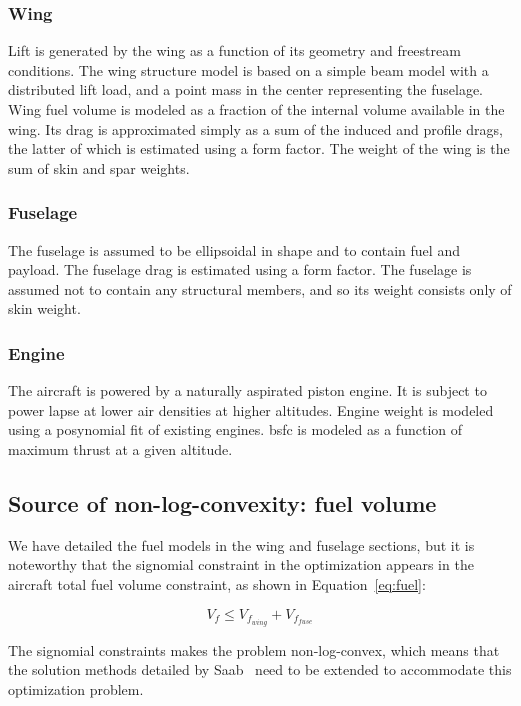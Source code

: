 \subsubsection{Wing}

Lift is generated by the wing as a function of its geometry and freestream conditions.
The wing structure model is based on a simple beam model with a distributed lift load,
and a point mass in the center representing the fuselage.
Wing fuel volume is modeled as a fraction of the internal volume available in the wing.
Its drag is
approximated simply as a sum of the induced and profile drags, the latter of which is estimated using a
form factor. The weight of the wing is the sum of skin and spar weights.

\subsubsection{Fuselage}

The fuselage is assumed to be ellipsoidal in shape and to contain fuel and payload.
The fuselage drag is estimated using a form factor.
The fuselage is assumed not to contain any structural members, and so its weight consists only of skin weight.

\subsubsection{Engine}

The aircraft is powered by a naturally aspirated piston engine. It is subject to
power lapse at lower air densities at higher altitudes. Engine weight is modeled using a posynomial fit of existing
engines. \gls{bsfc} is modeled as a function of maximum thrust at a given altitude.

\subsection{Source of non-log-convexity: fuel volume}
We have detailed the fuel models in the wing and fuselage sections, but it is noteworthy that
the signomial constraint in the optimization appears in the aircraft total fuel volume constraint,
as shown in Equation~\ref{eq:fuel}:

\begin{equation}
\label{eq:fuel}
V_f \leq V_{f_{wing}} + V_{f_{fuse}} 
\end{equation}

The signomial constraints makes the problem non-log-convex, which means that the solution methods
detailed by Saab~\cite{Saab2018} need to be extended to accommodate this optimization problem.
